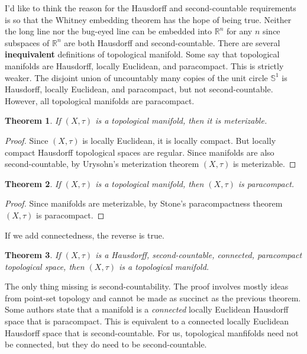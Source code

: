 \documentclass{article}
\theoremstyle{plain}
\newtheorem{theorem}{Theorem}[section]
\theoremstyle{normal}
\begin{document}
        I'd like to think the reason for the Hausdorff and second-countable
        requirements is so that the Whitney embedding theorem has the hope of
        being true. Neither the long line nor the bug-eyed line can be
        embedded into $\mathbb{R}^{n}$ for any $n$ since subspaces of
        $\mathbb{R}^{n}$ are both Hausdorff and second-countable. There are
        several \textbf{inequivalent} definitions of topological manifold. Some
        say that topological manifolds are Hausdorff, locally Euclidean, and
        paracompact. This is strictly weaker. The disjoint union of uncountably
        many copies of the unit circle $\mathbb{S}^{1}$ is Hausdorff, locally
        Euclidean, and paracompact, but not second-countable. However, all
        topological manifolds are paracompact.
        \begin{theorem}
            If $(X,\tau)$ is a topological manifold, then it is meterizable.
        \end{theorem}
        \begin{proof}
            Since $(X,\tau)$ is locally Euclidean, it is locally compact.
            But locally compact Hausdorff topological spaces are regular.
            Since manifolds are also second-countable,
            by Urysohn's meterization theorem $(X,\tau)$ is meterizable.
        \end{proof}
        \begin{theorem}
            If $(X,\tau)$ is a topological manifold, then $(X,\tau)$ is
            paracompact.
        \end{theorem}
        \begin{proof}
            Since manifolds are meterizable,
            by Stone's paracompactness theorem $(X,\tau)$ is paracompact.
        \end{proof}
        If we add connectedness, the reverse is true.
        \begin{theorem}
            If $(X,\tau)$ is a Hausdorff, second-countable, connected,
            paracompact topological space, then $(X,\tau)$ is a topological
            manifold.
        \end{theorem}
        The only thing missing is second-countability. The proof involves mostly
        ideas from point-set topology and cannot be made as succinct as the
        previous theorem. Some authors state that a manifold is a
        \textit{connected} locally Euclidean Hausdorff space that is
        paracompact. This is equivalent to a connected locally Euclidean
        Hausdorff space that is second-countable. For us, topological manfifolds
        need not be connected, but they do need to be second-countable.
\end{document}
